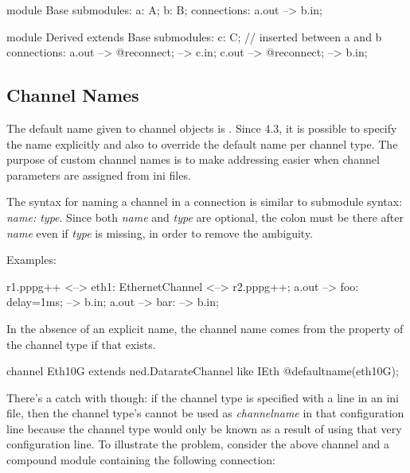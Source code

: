 \begin{ned}
module Base {
    submodules:
        a: A;
        b: B;
    connections:
        a.out --> b.in;
}

module Derived extends Base {
    submodules:
        c: C; // inserted between a and b
    connections:
        a.out --> {@reconnect;} --> c.in;
        c.out --> {@reconnect;} --> b.in;
}
\end{ned}


\subsection{Channel Names}
\label{sec:ned-lang:channel-names}

The default name given to channel objects is . Since {\opp} 4.3,
it is possible to specify the name explicitly and also to override
the default name per channel type. The purpose of custom channel names is to make
addressing easier when channel parameters are assigned from ini files.

The syntax for naming a channel in a connection is similar to submodule syntax:
\textit{name: type}. Since both \textit{name} and \textit{type} are optional,
the colon must be there after \textit{name} even if \textit{type} is missing,
in order to remove the ambiguity.

Examples:

\begin{ned}
r1.pppg++ <--> eth1: EthernetChannel <--> r2.pppg++;
a.out --> foo: {delay=1ms;} --> b.in;
a.out --> bar: --> b.in;
\end{ned}

In the absence of an explicit name, the channel name comes from the
 property of the channel type if that exists.

\begin{ned}
channel Eth10G extends ned.DatarateChannel like IEth {
    @defaultname(eth10G);
}
\end{ned}

There's a catch with  though: if the channel type is
specified with a  line in an ini file, then
the channel type's  cannot be used as \textit{channelname}
in that configuration line because the channel type would only be known as a
result of using that very configuration line. To illustrate the problem,
consider the above  channel and a compound module containing the
following connection:

